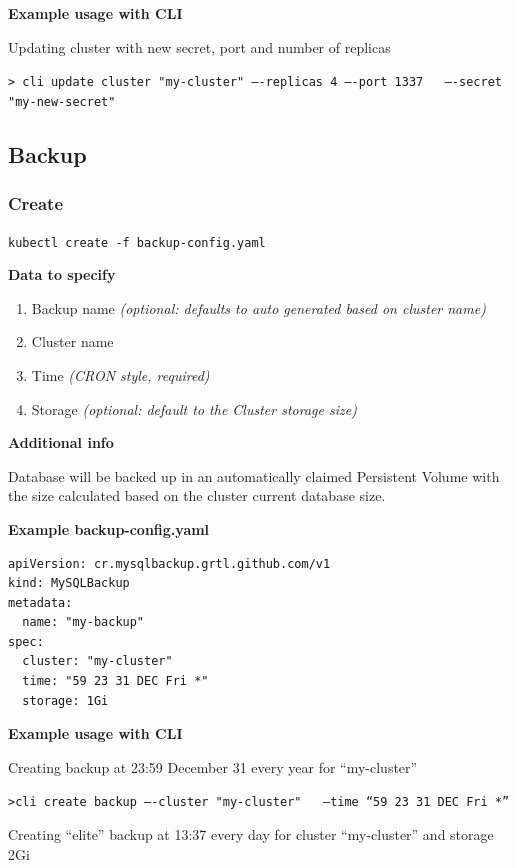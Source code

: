 \noindent \textbf{Example usage with CLI}

\noindent Updating cluster with new secret, port and number of replicas

\texttt{> cli update cluster "my-cluster" ----replicas 4 ----port 1337 \ \newline
----secret "my-new-secret"}

\subsection{Backup}
\subsubsection*{Create}
\texttt{kubectl create -f backup-config.yaml}

\noindent \textbf{Data to specify}
\begin{enumerate}
	\item Backup name \textit{(optional: defaults to auto generated based on cluster name)}
	\item Cluster name
	\item Time \textit{(CRON style, required)}
	\item Storage \textit{(optional: default to the Cluster storage size)}
\end{enumerate}

\noindent  \textbf{Additional info}

\noindent Database will be backed up in an automatically claimed Persistent Volume with the size
calculated based on the cluster current database size.

\noindent \textbf{Example \textbf{backup-config.yaml}}
\begin{lstlisting}[caption=backup-config.yaml,captionpos=b]
apiVersion: cr.mysqlbackup.grtl.github.com/v1
kind: MySQLBackup
metadata:
  name: "my-backup"
spec:
  cluster: "my-cluster"
  time: "59 23 31 DEC Fri *"
  storage: 1Gi
\end{lstlisting}

\noindent \textbf{Example usage with CLI}

\noindent Creating backup at 23:59 December 31 every year for “my-cluster”

\texttt{>cli create backup ----cluster "my-cluster" \ \newline
--time “59 23 31 DEC Fri *”}

\noindent Creating “elite” backup  at 13:37 every day for cluster “my-cluster” and storage 2Gi

